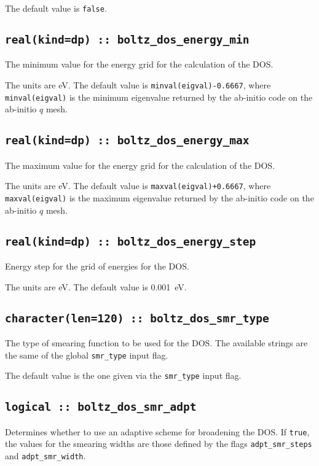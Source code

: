 The default value is \verb#false#.

\subsection[boltz\_dos\_energy\_min]{\tt real(kind=dp) :: boltz\_dos\_energy\_min}
The minimum value for the energy grid for the calculation of the DOS.

The units are eV.
The default value is {\tt minval(eigval)-0.6667}, where  {\tt minval(eigval)} is the minimum eigenvalue returned by the ab-initio code on the ab-initio $q$ mesh.

\subsection[boltz\_dos\_energy\_max]{\tt real(kind=dp) :: boltz\_dos\_energy\_max}
The maximum value for the energy grid for the calculation of the DOS.

The units are eV.
The default value is {\tt maxval(eigval)+0.6667}, where  {\tt maxval(eigval)} is the maximum eigenvalue returned by the ab-initio code on the ab-initio $q$ mesh.

\subsection[boltz\_dos\_energy\_step]{\tt real(kind=dp) :: boltz\_dos\_energy\_step}
Energy step for the grid of energies for the DOS.

The units are eV.
The default value is 0.001~eV.

\subsection[boltz\_dos\_smr\_type]{\tt character(len=120) :: boltz\_dos\_smr\_type}
The type of smearing function to be used for the DOS. The available strings are the same of the global {\tt smr\_type} input flag. 

The default value is the one given via the {\tt smr\_type} input flag. 


\subsection[boltz\_dos\_smr\_adaptive]{\tt logical :: boltz\_dos\_smr\_adpt}
Determines whether to use an adaptive scheme for broadening the DOS. If \verb#true#, the values for the smearing widths are those defined by the flags {\tt adpt\_smr\_steps} and {\tt adpt\_smr\_width}.

